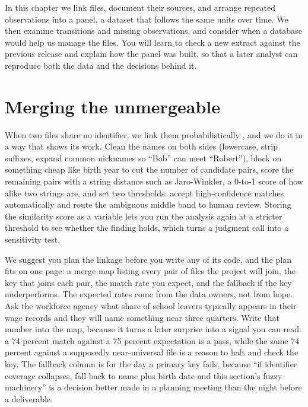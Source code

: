 \documentclass[
    a4paper,
    fontsize=10pt,
    twoside=true,
    numbers=noenddot,
]{kaobook}
\begin{document}
In this chapter we link files, document their sources, and arrange repeated observations into a panel, a dataset that follows the same units over time. We then examine transitions and missing observations, and consider when a database would help us manage the files. You will learn to check a new extract against the previous release and explain how the panel was built, so that a later analyst can reproduce both the data and the decisions behind it.

\section{Merging the unmergeable}
When two files share no identifier, we link them probabilistically \parencite{fellegi1969linkage}, and we do it in a way that shows its work. Clean the names on both sides (lowercase, strip suffixes, expand common nicknames so \enquote{Bob} can meet \enquote{Robert}), block on something cheap like birth year to cut the number of candidate pairs, score the remaining pairs with a string distance such as Jaro-Winkler, a 0-to-1 score of how alike two strings are, and set two thresholds: accept high-confidence matches automatically and route the ambiguous middle band to human review. Storing the similarity score as a variable lets you run the analysis again at a stricter threshold to see whether the finding holds, which turns a judgment call into a sensitivity test.

We suggest you plan the linkage before you write any of its code, and the plan fits on one page: a merge map listing every pair of files the project will join, the key that joins each pair, the match rate you expect, and the fallback if the key underperforms. The expected rates come from the data owners, not from hope. Ask the workforce agency what share of school leavers typically appears in their wage records and they will name something near three quarters. Write that number into the map, because it turns a later surprise into a signal you can read: a 74 percent match against a 75 percent expectation is a pass, while the same 74 percent against a supposedly near-universal file is a reason to halt and check the key. The fallback column is for the day a primary key fails, because \enquote{if identifier coverage collapses, fall back to name plus birth date and this section's fuzzy machinery} is a decision better made in a planning meeting than the night before a deliverable.
\end{document}
